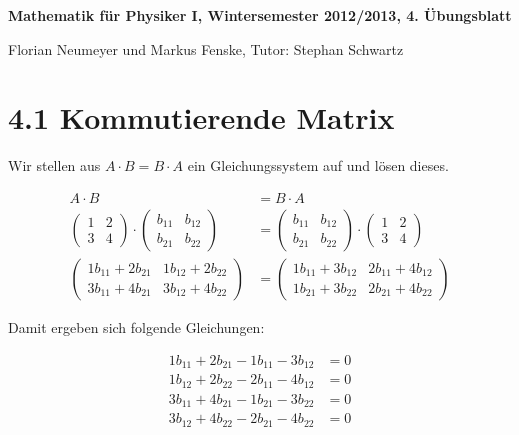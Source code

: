 \documentclass[a4paper,german,12pt,smallheadings]{scrartcl}
\begin{document}
\begin{center}
\bfseries %
\sffamily %
\vspace{-40pt}
Mathematik für Physiker I, Wintersemester 2012/2013, 4. Übungsblatt

Florian Neumeyer und Markus Fenske, Tutor: Stephan Schwartz
\vspace{-10pt}
\end{center}

\section*{4.1 Kommutierende Matrix}

Wir stellen aus $A \cdot B = B \cdot A$ ein Gleichungssystem auf und lösen dieses.

\begin{align*}
A \cdot B &= B \cdot A \\
\begin{pmatrix}
1 & 2 \\
3 & 4
\end{pmatrix}
\cdot
\begin{pmatrix}
b_{11} & b_{12} \\
b_{21} & b_{22}
\end{pmatrix}
&=
\begin{pmatrix}
b_{11} & b_{12} \\
b_{21} & b_{22}
\end{pmatrix}
\cdot
\begin{pmatrix}
1 & 2 \\
3 & 4
\end{pmatrix} \\
\begin{pmatrix}
1b_{11} + 2b_{21} & 1b_{12} + 2b_{22} \\
3b_{11} + 4b_{21} & 3b_{12} + 4b_{22}
\end{pmatrix}
&=
\begin{pmatrix}
1b_{11} + 3b_{12} & 2b_{11} + 4b_{12} \\
1b_{21} + 3b_{22} & 2b_{21} + 4b_{22}
\end{pmatrix}
\end{align*}

Damit ergeben sich folgende Gleichungen:

\begin{align*}
1b_{11} + 2b_{21} - 1b_{11} - 3b_{12} &= 0 \\
1b_{12} + 2b_{22} - 2b_{11} - 4b_{12} &= 0 \\
3b_{11} + 4b_{21} - 1b_{21} - 3b_{22} &= 0 \\
3b_{12} + 4b_{22} - 2b_{21} - 4b_{22} &= 0
\end{align*}
\end{document}
